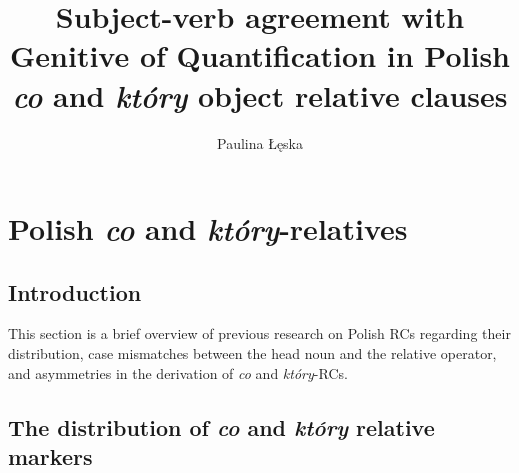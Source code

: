\documentclass[output=paper]{langsci/langscibook}
\author{Paulina Łęska\affiliation{Adam Mickiewicz University in Poznań}}
\title{Subject-verb agreement with Genitive of Quantification in Polish \textit{co} and \textit{który} object relative clauses}
\begin{document}
 

 

 

 

 

 

 

 

 



\section{Polish \textit{co} and \textit{który}{}-relatives}%
\subsection{Introduction}%
This section is a brief overview of previous research on Polish RCs regarding their distribution, case mismatches between the head noun and the relative operator, and asymmetries in the derivation of \textit{co} and \textit{który}{}-RCs. 


\subsection{The distribution of \textit{co} and \textit{który} relative markers}%
\end{document}
